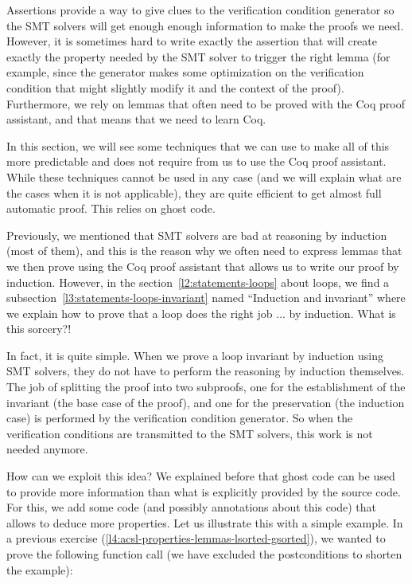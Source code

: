 Assertions provide a way to give clues to the verification condition generator
so the SMT solvers will get enough enough information to make the proofs we
need. However, it is sometimes hard to write exactly the assertion that will
create exactly the property needed by the SMT solver to trigger the right lemma
(for example, since the generator makes some optimization on the verification
condition that might slightly modify it and the context of the proof).
Furthermore, we rely on lemmas that often need to be proved with the Coq proof
assistant, and that means that we need to learn Coq.



In this section, we will see some techniques that we can use to make all of this
more predictable and does not require from us to use the Coq proof assistant.
While these techniques cannot be used in any case (and we will explain what are
the cases when it is not applicable), they are quite efficient to get almost
full automatic proof. This relies on ghost code.






Previously, we mentioned that SMT solvers are bad at reasoning by induction
(most of them), and this is the reason why we often need to express lemmas that
we then prove using the Coq proof assistant that allows us to write our proof
by induction. However, in the section~\ref{l2:statements-loops} about loops, we
find a subsection~\ref{l3:statements-loops-invariant} named ``Induction and
invariant'' where we explain how to prove that a loop does the right job ... by
induction. What is this sorcery?!




In fact, it is quite simple. When we prove a loop invariant by induction using
SMT solvers, they do not have to perform the reasoning by induction themselves.
The job of splitting the proof into two subproofs, one for the establishment of
the invariant (the base case of the proof), and one for the preservation (the
induction case) is performed by the verification condition generator. So when
the verification conditions are transmitted to the SMT solvers, this work is not
needed anymore.




How can we exploit this idea? We explained before that ghost code can be used to
provide more information than what is explicitly provided by the source code.
For this, we add some code (and possibly annotations about this code) that
allows to deduce more properties. Let us illustrate this with a simple example.
In a previous exercise (\ref{l4:acsl-properties-lemmas-lsorted-gsorted}), we
wanted to prove the following function call (we have excluded the postconditions
to shorten the example):



